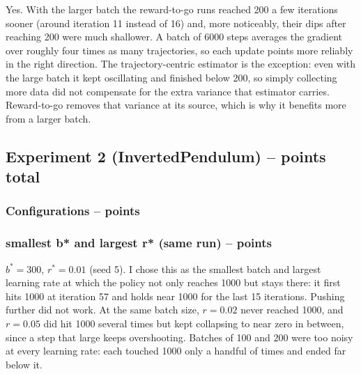 \documentclass{article}
\makeatletter
\newcommand\subsubsubsection{\@startsection{paragraph}{4}{\z@}{-2.5ex\@plus -1ex \@minus -.25ex}{1.25ex \@plus .25ex}{\normalfont\normalsize\bfseries}}
\makeatother
\begin{document}
\subsubsubsection{Batch size -- \lbrack1 points\rbrack}
\begin{answer}[title=Q5.1.3.3,height=4cm,width=\linewidth]
Yes. With the larger batch the reward-to-go runs reached 200 a few iterations sooner (around iteration 11 instead of 16) and, more noticeably, their dips after reaching 200 were much shallower. A batch of 6000 steps averages the gradient over roughly four times as many trajectories, so each update points more reliably in the right direction. The trajectory-centric estimator is the exception: even with the large batch it kept oscillating and finished below 200, so simply collecting more data did not compensate for the extra variance that estimator carries. Reward-to-go removes that variance at its source, which is why it benefits more from a larger batch.
\end{answer}

\subsection{Experiment 2 (InvertedPendulum) --  points total\rbrack}

\subsubsection{Configurations --  points\rbrack}

\subsubsection{smallest \textbf{b*} and largest \textbf{r*} (same run) --  points\rbrack}
\begin{answer}[title=Q5.2.2,height=4cm,width=\linewidth]
$b^* = 300$, $r^* = 0.01$ (seed 5). I chose this as the smallest batch and largest learning rate at which the policy not only reaches 1000 but stays there: it first hits 1000 at iteration 57 and holds near 1000 for the last 15 iterations. Pushing further did not work. At the same batch size, $r=0.02$ never reached 1000, and $r=0.05$ did hit 1000 several times but kept collapsing to near zero in between, since a step that large keeps overshooting. Batches of 100 and 200 were too noisy at every learning rate: each touched 1000 only a handful of times and ended far below it.
\end{answer}
\end{document}
